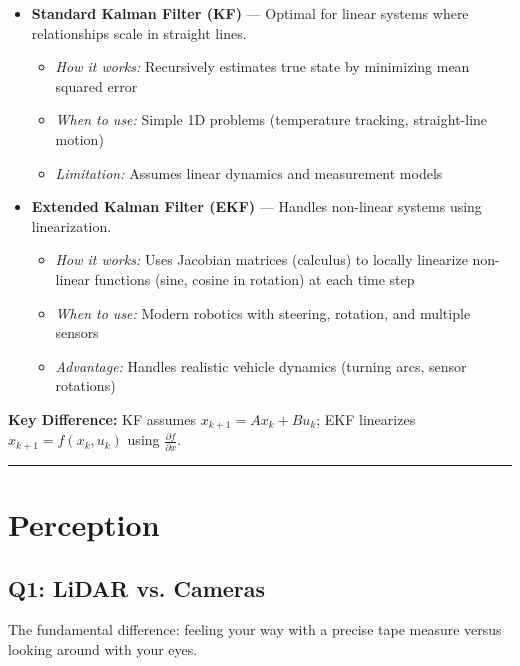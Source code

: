 \documentclass[12pt,a4paper]{article}
\begin{document}
\begin{itemize}[leftmargin=*]
    \item \textbf{Standard Kalman Filter (KF)} — Optimal for linear systems where relationships scale in straight lines.
    \begin{itemize}
        \item \textit{How it works:} Recursively estimates true state by minimizing mean squared error
        \item \textit{When to use:} Simple 1D problems (temperature tracking, straight-line motion)
        \item \textit{Limitation:} Assumes linear dynamics and measurement models
    \end{itemize}
    
    \item \textbf{Extended Kalman Filter (EKF)} — Handles non-linear systems using linearization.
    \begin{itemize}
        \item \textit{How it works:} Uses Jacobian matrices (calculus) to locally linearize non-linear functions (sine, cosine in rotation) at each time step
        \item \textit{When to use:} Modern robotics with steering, rotation, and multiple sensors
        \item \textit{Advantage:} Handles realistic vehicle dynamics (turning arcs, sensor rotations)
    \end{itemize}
\end{itemize}

\noindent\textbf{Key Difference:} KF assumes $x_{k+1} = Ax_k + Bu_k$; EKF linearizes $x_{k+1} = f(x_k, u_k)$ using $\frac{\partial f}{\partial x}$.

\vspace{0.3em}
\noindent\rule{\textwidth}{0.4pt}
\vspace{0.3em}

\section{Perception}

\subsection{Q1: LiDAR vs. Cameras}

The fundamental difference: feeling your way with a precise tape measure versus looking around with your eyes.
\end{document}
